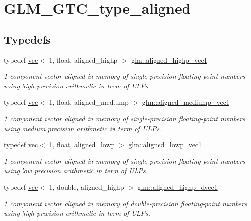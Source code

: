 \hypertarget{group__gtc__type__aligned}{}\section{G\+L\+M\+\_\+\+G\+T\+C\+\_\+type\+\_\+aligned}
\label{group__gtc__type__aligned}
\subsection*{Typedefs}
\begin{DoxyCompactItemize}
\item 
typedef \mbox{\hyperlink{structglm_1_1vec}{vec}}$<$ 1, float, aligned\+\_\+highp $>$ \mbox{\hyperlink{group__gtc__type__aligned_ga8da7535c1fe488b2b9a29c0c05e7b17e}{glm\+::aligned\+\_\+highp\+\_\+vec1}}
\begin{DoxyCompactList}\small\item\em 1 component vector aligned in memory of single-\/precision floating-\/point numbers using high precision arithmetic in term of U\+L\+Ps. \end{DoxyCompactList}\item 
typedef \mbox{\hyperlink{structglm_1_1vec}{vec}}$<$ 1, float, aligned\+\_\+mediump $>$ \mbox{\hyperlink{group__gtc__type__aligned_ga8751a96bb361e9f007e5555eb90e3230}{glm\+::aligned\+\_\+mediump\+\_\+vec1}}
\begin{DoxyCompactList}\small\item\em 1 component vector aligned in memory of single-\/precision floating-\/point numbers using medium precision arithmetic in term of U\+L\+Ps. \end{DoxyCompactList}\item 
typedef \mbox{\hyperlink{structglm_1_1vec}{vec}}$<$ 1, float, aligned\+\_\+lowp $>$ \mbox{\hyperlink{group__gtc__type__aligned_ga9a7ee43ec4c9d0c59740b96c10aee479}{glm\+::aligned\+\_\+lowp\+\_\+vec1}}
\begin{DoxyCompactList}\small\item\em 1 component vector aligned in memory of single-\/precision floating-\/point numbers using low precision arithmetic in term of U\+L\+Ps. \end{DoxyCompactList}\item 
typedef \mbox{\hyperlink{structglm_1_1vec}{vec}}$<$ 1, double, aligned\+\_\+highp $>$ \mbox{\hyperlink{group__gtc__type__aligned_ga85671dcb7eef983b5035273fe78dd963}{glm\+::aligned\+\_\+highp\+\_\+dvec1}}
\begin{DoxyCompactList}\small\item\em 1 component vector aligned in memory of double-\/precision floating-\/point numbers using high precision arithmetic in term of U\+L\+Ps. \end{DoxyCompactList}\item 

\end{DoxyCompactItemize}
